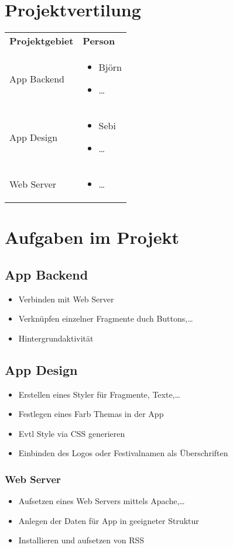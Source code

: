 \documentclass[a4paper,12pt,
headsepline,           %
oneside,               %
pointlessnumbers,      %
bibtotoc,              %
BCOR15mm               %
]{scrbook}
\begin{document}
\section*{Projektvertilung}
\begin{tabular}{@{}lP{6cm}@{}} 
    \textbf{Projektgebiet} & \textbf{Person} \\[5pt]
    App Backend &
      \begin{itemize}
        \item Björn 
        \item \dots
      \end{itemize}\\

    App Design &
     \begin{itemize}
         \item Sebi
         \item \dots
     \end{itemize}\\

    Web Server &
     \begin{itemize}
         \item \dots
     \end{itemize}\\
\end{tabular}

\section*{Aufgaben im Projekt}
\subsection*{App Backend}
\begin{itemize}
    \item Verbinden mit Web Server
    \item Verknüpfen einzelner Fragmente duch Buttons,\dots
    \item Hintergrundaktivität
\end{itemize}

\subsection*{App Design}
\begin{itemize}
    \item Erstellen eines Styler für Fragmente, Texte,\dots
    \item Festlegen eines Farb Themas in der App
    \item Evtl Style via CSS generieren
    \item Einbinden des Logos oder Festivalnamen als Überschriften
\end{itemize}

\subsubsection*{Web Server}
\begin{itemize}
    \item Aufsetzen eines Web Servers mittels Apache,\dots
    \item Anlegen der Daten für App in geeigneter Struktur
    \item Installieren und aufsetzen von RSS
\end{itemize}
\end{document}
